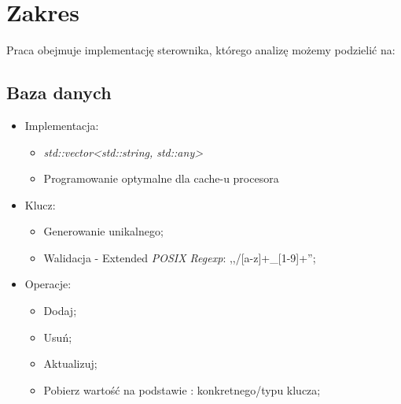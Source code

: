 \section{Zakres}
	Praca obejmuje implementację sterownika, którego analizę możemy podzielić na:

	\subsection{Baza danych}
	\begin{itemize}
		\item Implementacja:
		\begin{itemize}
			\item \textit{std::vector<std::string, std::any>}
			\item Programowanie optymalne dla cache-u procesora
		\end{itemize}
		\item Klucz:
		\begin{itemize}
			\item Generowanie unikalnego;
			\item Walidacja - Extended \textit{POSIX Regexp}: ,,/[a-z]+\_[1-9]+'';
		\end{itemize}
		\item Operacje:
		\begin{itemize}
			\item Dodaj;
			\item Usuń;
			\item Aktualizuj;
			\item Pobierz wartość na podstawie : konkretnego/typu klucza;
		\end{itemize}
	\end{itemize}

